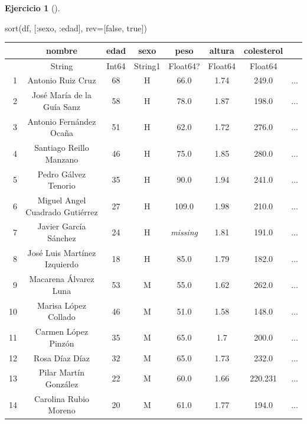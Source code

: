 \documentclass[
  a4paper,
]{scrreport}
\newenvironment{Shaded}{\begin{snugshade}}{\end{snugshade}}
\newcommand{\ConstantTok}[1]{\textcolor[rgb]{0.56,0.35,0.01}{#1}}
\newcommand{\FunctionTok}[1]{\textcolor[rgb]{0.28,0.35,0.67}{#1}}
\newcommand{\NormalTok}[1]{\textcolor[rgb]{0.00,0.23,0.31}{#1}}
\newcommand{\OperatorTok}[1]{\textcolor[rgb]{0.37,0.37,0.37}{#1}}
\theoremstyle{definition}
\newtheorem{exercise}{Ejercicio}[chapter]
\theoremstyle{remark}
\begin{document}
\begin{exercise}[]
\begin{enumerate}
\begin{tcolorbox}
\begin{Shaded}
\begin{Highlighting}[]
\FunctionTok{sort}\NormalTok{(df, [}\OperatorTok{:}\NormalTok{sexo, }\OperatorTok{:}\NormalTok{edad], rev}\OperatorTok{=}\NormalTok{[}\ConstantTok{false}\NormalTok{, }\ConstantTok{true}\NormalTok{])}
\end{Highlighting}
\end{Shaded}

  \begin{tabular}{r|ccccccc}
      & nombre & edad & sexo & peso & altura & colesterol & \\
      \hline
      & String & Int64 & String1 & Float64? & Float64 & Float64 & \\
      \hline
      1 & Antonio Ruiz Cruz & 68 & H & 66.0 & 1.74 & 249.0 & $\dots$ \\
      2 & José María de la Guía Sanz & 58 & H & 78.0 & 1.87 & 198.0 & $\dots$ \\
      3 & Antonio Fernández Ocaña & 51 & H & 62.0 & 1.72 & 276.0 & $\dots$ \\
      4 & Santiago Reillo Manzano & 46 & H & 75.0 & 1.85 & 280.0 & $\dots$ \\
      5 & Pedro Gálvez Tenorio & 35 & H & 90.0 & 1.94 & 241.0 & $\dots$ \\
      6 & Miguel Angel Cuadrado Gutiérrez & 27 & H & 109.0 & 1.98 & 210.0 & $\dots$ \\
      7 & Javier García Sánchez & 24 & H & \emph{missing} & 1.81 & 191.0 & $\dots$ \\
      8 & José Luis Martínez Izquierdo & 18 & H & 85.0 & 1.79 & 182.0 & $\dots$ \\
      9 & Macarena Álvarez Luna & 53 & M & 55.0 & 1.62 & 262.0 & $\dots$ \\
      10 & Marisa López Collado & 46 & M & 51.0 & 1.58 & 148.0 & $\dots$ \\
      11 & Carmen López Pinzón & 35 & M & 65.0 & 1.7 & 200.0 & $\dots$ \\
      12 & Rosa Díaz Díaz & 32 & M & 65.0 & 1.73 & 232.0 & $\dots$ \\
      13 & Pilar Martín González & 22 & M & 60.0 & 1.66 & 220.231 & $\dots$ \\
      14 & Carolina Rubio Moreno & 20 & M & 61.0 & 1.77 & 194.0 & $\dots$ \\
  \end{tabular}

  \end{tcolorbox}
\end{enumerate}

\end{exercise}
\end{document}
